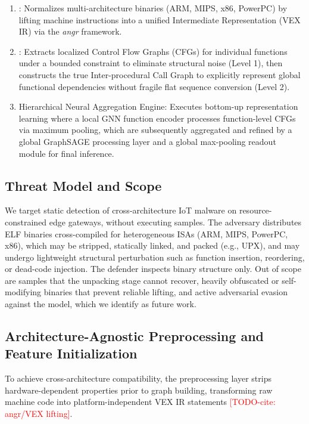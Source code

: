 \documentclass{llncs}
\begin{document}
\begin{enumerate}
    \item {}: Normalizes multi-architecture binaries (ARM, MIPS, x86, PowerPC) by lifting machine instructions into a unified Intermediate Representation (VEX IR) via the \textit{angr} framework.
    \item {}: Extracts localized Control Flow Graphs (CFGs) for individual functions under a bounded constraint to eliminate structural noise (Level 1), then constructs the true Inter-procedural Call Graph to explicitly represent global functional dependencies without fragile flat sequence conversion (Level 2).
    \item Hierarchical Neural Aggregation Engine: Executes bottom-up representation learning where a local GNN function encoder processes function-level CFGs via maximum pooling, which are subsequently aggregated and refined by a global GraphSAGE processing layer and a global max-pooling readout module for final inference.
\end{enumerate}


\subsection{Threat Model and Scope}
We target static detection of cross-architecture IoT malware on resource-constrained edge gateways,
without executing samples. The adversary distributes ELF binaries cross-compiled for heterogeneous
ISAs (ARM, MIPS, PowerPC, x86), which may be stripped, statically linked, and packed (e.g., UPX), and
may undergo lightweight structural perturbation such as function insertion, reordering, or dead-code
injection. The defender inspects binary structure only. Out of scope are samples that the unpacking
stage cannot recover, heavily obfuscated or self-modifying binaries that prevent reliable lifting, and
active adversarial evasion against the model, which we identify as future work.


\subsection{Architecture-Agnostic Preprocessing and Feature Initialization}
To achieve cross-architecture compatibility, the preprocessing layer strips hardware-dependent properties prior to graph building, transforming raw machine code into platform-independent VEX IR statements \textcolor{red}{[TODO-cite: angr/VEX lifting]}.
\end{document}
